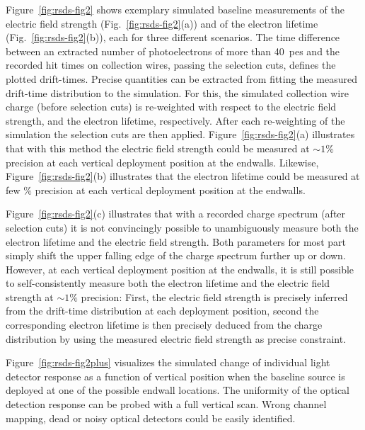 Figure~\ref{fig:rsds-fig2}
shows exemplary simulated baseline  measurements of the electric field strength (Fig.~\ref{fig:rsds-fig2}(a)) and of the electron lifetime (Fig.~\ref{fig:rsds-fig2}(b)), each for three different scenarios. The time difference between an extracted number of photoelectrons of more than 40~pes and the recorded hit times on collection wires, passing the selection cuts, defines the plotted drift-times. Precise quantities can be extracted from fitting the measured drift-time distribution to the simulation. For this, the simulated collection wire charge (before selection cuts) is re-weighted with respect to 
the electric field strength, and 
the electron lifetime, respectively. After each re-weighting of the simulation the selection cuts are then applied. Figure~\ref{fig:rsds-fig2}(a)
illustrates that with this method the electric field strength could be measured at $\sim 1\%$ precision at each vertical deployment position at the endwalls. Likewise, Figure~\ref{fig:rsds-fig2}(b)
illustrates that the electron lifetime could be measured at few $\%$ precision at each vertical deployment position at the endwalls. 

Figure~\ref{fig:rsds-fig2}(c)
illustrates that with a recorded charge spectrum (after selection cuts) it is not convincingly possible to unambiguously measure both the electron lifetime and the electric field strength. Both parameters for most part simply shift the upper falling edge of the charge spectrum further up or down. However, at each vertical  deployment position at the endwalls, it is still possible to self-consistently measure both the electron lifetime and the electric field strength at $\sim 1\%$ precision: First, the electric field strength is precisely inferred from the drift-time distribution at each deployment position, second the corresponding electron lifetime is then precisely deduced from the charge distribution by using the measured electric field strength as precise constraint. 

Figure~\ref{fig:rsds-fig2plus} visualizes the simulated change of individual light detector response as a function of  vertical position when the baseline source is deployed at one of the possible endwall locations. The uniformity of the optical detection response can be probed with a full vertical scan. Wrong channel mapping, dead or noisy optical detectors could be easily identified. 

